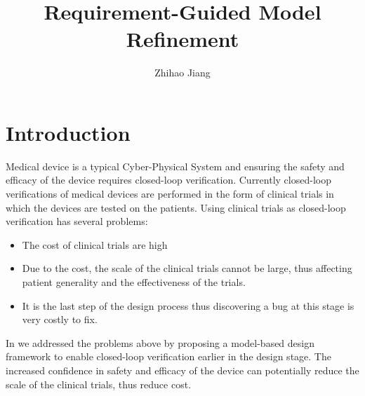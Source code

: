 \documentclass{llncs}
\begin{document}
%
\frontmatter          %
%
\pagestyle{headings}  %
%
%
\title{Requirement-Guided Model Refinement}
\author{Zhihao Jiang}\vspace{-10pt}

\maketitle              %
\vspace{-10pt}


        

\section{Introduction}
Medical device is a typical Cyber-Physical System and ensuring the safety and efficacy of the device requires closed-loop verification. Currently closed-loop verifications of medical devices are performed in the form of clinical trials in which the devices are tested on the patients. Using clinical trials as closed-loop verification has several problems:
\begin{itemize}
	\item The cost of clinical trials are high
    \item Due to the cost, the scale of the clinical trials cannot be large, thus affecting patient generality and the effectiveness of the trials.
    \item It is the last step of the design process thus discovering a bug at this stage is very costly to fix.
\end{itemize}
In \cite{VHM_proc} we addressed the problems above by proposing a model-based design framework to enable closed-loop verification earlier in the design stage. The increased confidence in safety and efficacy of the device can potentially reduce the scale of the clinical trials, thus reduce cost.
\end{document}
